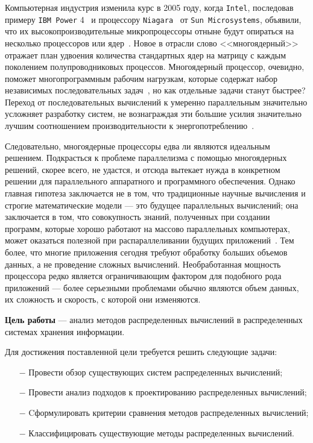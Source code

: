 
Компьютерная индустрия изменила курс в 2005 году, когда \texttt{Intel}, последовав примеру \texttt{IBM Power} 4~\cite{power4} и процессору \texttt{Niagara}~\cite{uddin2013advances} от \texttt{Sun Microsystems}, объявили, что их высокопроизводительные микропроцессоры отныне будут опираться на несколько процессоров или ядер~\cite{intel-multi}.
Новое в отрасли слово <<многоядерный>> отражает план удвоения количества стандартных ядер на матрицу с каждым поколением полупроводниковых процессов.
Многоядерный процессор, очевидно, поможет многопрограммным рабочим нагрузкам, которые содержат набор независимых последовательных задач~\cite{Asanović:EECS-2006-183}, но как отдельные задачи станут быстрее?
Переход от последовательных вычислений к умеренно параллельным значительно усложняет разработку систем, не вознаграждая эти большие усилия значительно лучшим соотношением производительности к энергопотреблению~\cite{parallel}.

Следовательно, многоядерные процессоры едва ли являются идеальным решением.
Подкрасться к проблеме параллелизма с помощью многоядерных решений, скорее всего, не удастся, и отсюда вытекает нужда в конкретном решении для параллельного аппаратного и программного обеспечения.
Однако главная гипотеза заключается не в том, что традиционные научные вычисления и строгие математические модели --- это будущее параллельных вычислений; она заключается в том, что совокупность знаний, полученных при создании программ, которые хорошо работают на массово параллельных компьютерах, может оказаться полезной при распараллеливании будущих приложений~\cite{lynchdistributed}.
Тем более, что многие приложения сегодня требуют обработку больших объемов данных, а не проведение сложных вычислений. 
Необработанная мощность процессора редко является ограничивающим фактором для подобного рода приложений --- более серьезными проблемами обычно являются объем данных, их сложность и скорость, с которой они изменяются.

\vspace{0.1cm}
\textbf{Цель работы} --- анализ методов распределенных вычислений в распределенных системах хранения информации.
\vspace{0.1cm}

Для достижения поставленной цели требуется решить следующие задачи: %
\begin{itemize}
    \item[$-$] Провести обзор существующих систем распределенных вычислений;
    \item[$-$] Провести анализ подходов к проектированию распределенных вычислений;
    \item[$-$] Cформулировать критерии сравнения методов распределенных вычислений;
    \item[$-$] Классифицировать существующие методы распределенных вычислений.
\end{itemize}

